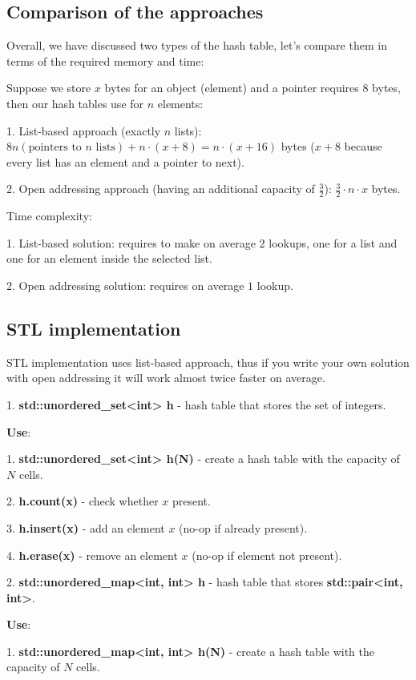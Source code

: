 \subsection{Comparison of the approaches}

Overall, we have discussed two types of the hash table, let's compare them in terms of the required memory and time:

Suppose we store $x$ bytes for an object (element) and a pointer requires $8$ bytes, then our hash tables use for $n$ elements:

1. List-based approach (exactly $n$ lists): $8n (\text{pointers to $n$ lists}) + n \cdot (x + 8) = n \cdot (x+16)$ bytes ($x+8$ because every list has an element and a pointer to next).

2. Open addressing approach (having an additional capacity of $\frac{3}{2}$): $\frac{3}{2} \cdot n \cdot x$ bytes.

Time complexity:

1. List-based solution: requires to make on average $2$ lookups, one for a list and one for an element inside the selected list.

2. Open addressing solution: requires on average $1$ lookup.


\subsection{STL implementation}

STL implementation uses list-based approach, thus if you write your own solution with open addressing it will work almost twice faster on average.

1. \textbf{std::unordered\_set<int> h} - hash table that stores the set of integers.

\textbf{Use}:

1. \textbf{std::unordered\_set<int> h(N)} - create a hash table with the capacity of $N$ cells.

2. \textbf{h.count(x)} - check whether $x$ present.

3. \textbf{h.insert(x)} - add an element $x$ (no-op if already present).

4. \textbf{h.erase(x)} - remove an element $x$ (no-op if element not present).


2. \textbf{std::unordered\_map<int, int> h} - hash table that stores \textbf{std::pair<int, int>}.

\textbf{Use}:

1. \textbf{std::unordered\_map<int, int> h(N)} - create a hash table with the capacity of $N$ cells.

